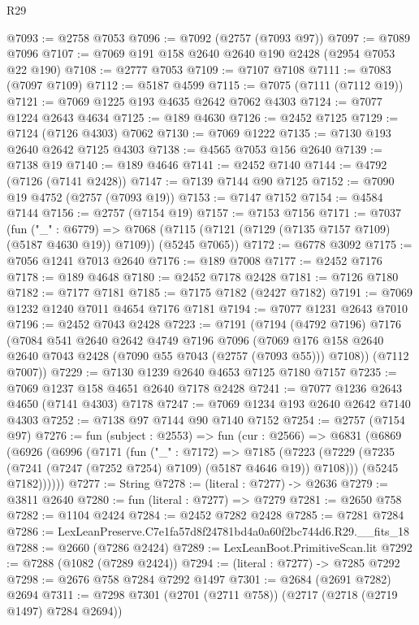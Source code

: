 \begin{lexlean}{R29}
\begin{coremodule}
@7093 := @2758 @7053
@7096 := @7092 (@2757 (@7093 @97))
@7097 := @7089 @7096
@7107 := @7069 @191 @158 @2640 @2640 @190 @2428 (@2954 @7053 @22 @190)
@7108 := @2777 @7053
@7109 := @7107 @7108
@7111 := @7083 (@7097 @7109)
@7112 := @5187 @4599
@7115 := @7075 (@7111 (@7112 @19))
@7121 := @7069 @1225 @193 @4635 @2642 @7062 @4303
@7124 := @7077 @1224 @2643 @4634
@7125 := @189 @4630
@7126 := @2452 @7125
@7129 := @7124 (@7126 @4303) @7062
@7130 := @7069 @1222
@7135 := @7130 @193 @2640 @2642 @7125 @4303
@7138 := @4565 @7053 @156 @2640
@7139 := @7138 @19
@7140 := @189 @4646
@7141 := @2452 @7140
@7144 := @4792 (@7126 (@7141 @2428))
@7147 := @7139 @7144 @90 @7125
@7152 := @7090 @19 @4752 (@2757 (@7093 @19))
@7153 := @7147 @7152
@7154 := @4584 @7144
@7156 := @2757 (@7154 @19)
@7157 := @7153 @7156
@7171 := @7037
    (fun ("_" : @6779) =>
    @7068 (@7115 (@7121 (@7129 (@7135 @7157 @7109) (@5187 @4630 @19)) @7109)) (@5245 @7065))
@7172 := @6778 @3092
@7175 := @7056 @1241 @7013 @2640
@7176 := @189 @7008
@7177 := @2452 @7176
@7178 := @189 @4648
@7180 := @2452 @7178 @2428
@7181 := @7126 @7180
@7182 := @7177 @7181
@7185 := @7175 @7182 (@2427 @7182)
@7191 := @7069 @1232 @1240 @7011 @4654 @7176 @7181
@7194 := @7077 @1231 @2643 @7010
@7196 := @2452 @7043 @2428
@7223 := @7191
    (@7194
      (@4792 @7196)
      @7176
      (@7084
        @541
        @2640
        @2642
        @4749
        @7196
        @7096
        (@7069 @176 @158 @2640 @2640 @7043 @2428 (@7090 @55 @7043 (@2757 (@7093 @55))) @7108))
      (@7112 @7007))
@7229 := @7130 @1239 @2640 @4653 @7125 @7180 @7157
@7235 := @7069 @1237 @158 @4651 @2640 @7178 @2428
@7241 := @7077 @1236 @2643 @4650 (@7141 @4303) @7178
@7247 := @7069 @1234 @193 @2640 @2642 @7140 @4303
@7252 := @7138 @97 @7144 @90 @7140 @7152
@7254 := @2757 (@7154 @97)
@7276 := fun (subject : @2553) =>
  fun (cur : @2566) =>
  @6831
    (@6869
      (@6926
        (@6996
          (@7171
            (fun ("_" : @7172) =>
            @7185
              (@7223 (@7229 (@7235 (@7241 (@7247 (@7252 @7254) @7109) (@5187 @4646 @19)) @7108)))
              (@5245 @7182))))))
@7277 := String
@7278 := (literal : @7277) -> @2636
@7279 := @3811 @2640
@7280 := fun (literal : @7277) => @7279
@7281 := @2650 @758
@7282 := @1104 @2424
@7284 := @2452 @7282 @2428
@7285 := @7281 @7284
@7286 := LexLeanPreserve.C7e1fa57d8f24781bd4a0a60f2bc744d6.R29.__fits_18
@7288 := @2660 (@7286 @2424)
@7289 := LexLeanBoot.PrimitiveScan.lit
@7292 := @7288 (@1082 (@7289 @2424))
@7294 := (literal : @7277) -> @7285 @7292
@7298 := @2676 @758 @7284 @7292 @1497
@7301 := @2684 (@2691 @7282) @2694
@7311 := @7298 @7301 (@2701 (@2711 @758)) (@2717 (@2718 (@2719 @1497) @7284 @2694))

\end{coremodule}
\end{lexlean}
